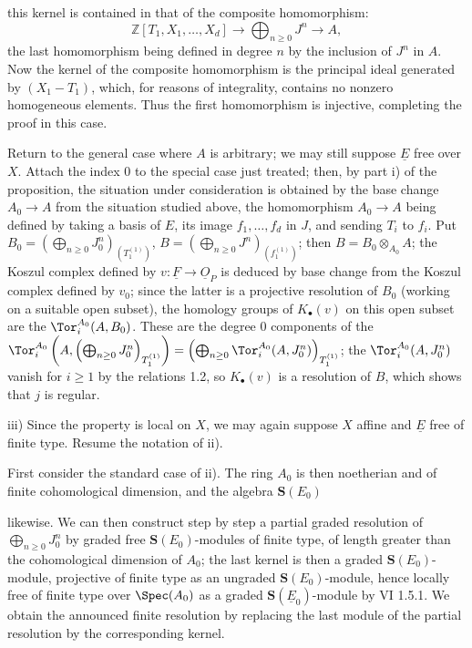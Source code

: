 %
this kernel is contained in that of the composite homomorphism:
\[
\mathbb Z[T_1,X_1,\ldots,X_d]\longrightarrow
\bigoplus_{n\ge0}J^n\longrightarrow A,
\]
the last homomorphism being defined in degree \(n\) by the inclusion of \(J^n\) in \(A\). Now the kernel of the composite homomorphism is the principal ideal generated by \((X_1-T_1)\), which, for reasons of integrality, contains no nonzero homogeneous elements. Thus the first homomorphism is injective, completing the proof in this case.

Return to the general case where \(A\) is arbitrary; we may still suppose \(\underline{E}\) free over \(X\). Attach the index \(0\) to the special case just treated; then, by part i) of the proposition, the situation under consideration is obtained by the base change \(A_0\to A\) from the situation studied above, the homomorphism \(A_0\to A\) being defined by taking a basis of \(E\), its image \(f_1,\ldots,f_d\) in \(J\), and sending \(T_i\) to \(f_i\). Put \(B_0=\left(\bigoplus_{n\ge0}J_0^n\right)_{(T_1^{(1)})}\), \(B=\left(\bigoplus_{n\ge0}J^n\right)_{(f_1^{(1)})}\); then \(B=B_0\otimes_{A_0}A\); the Koszul complex defined by \(v:\underline{F}\to\underline{O}_P\) is deduced by base change from the Koszul complex defined by \(v_0\); since the latter is a projective resolution of \(B_0\) (working on a suitable open subset), the homology groups of \(K_\bullet(v)\) on this open subset are the \(\Tor_i^{A_0}(A,B_0)\). These are the degree \(0\) components of the \(\Tor_i^{A_0}\left(A,\left(\bigoplus_{n\ge0}J_0^n\right)_{T_1^{(1)}}\right)=\left(\bigoplus_{n\ge0}\Tor_i^{A_0}(A,J_0^n)\right)_{T_1^{(1)}}\); the \(\Tor_i^{A_0}(A,J_0^n)\) vanish for \(i\ge1\) by the relations 1.2, so \(K_\bullet(v)\) is a resolution of \(B\), which shows that \(j\) is regular.

iii) Since the property is local on \(X\), we may again suppose \(X\) affine and \(\underline{E}\) free of finite type. Resume the notation of ii).

First consider the standard case of ii). The ring \(A_0\) is then noetherian and of finite cohomological dimension, and the algebra \(\mathbf{S}(E_0)\)

%
likewise. We can then construct step by step a partial graded resolution of \(\bigoplus_{n\ge0}J_0^n\) by graded free \(\mathbf{S}(E_0)\)-modules of finite type, of length greater than the cohomological dimension of \(A_0\); the last kernel is then a graded \(\mathbf{S}(E_0)\)-module, projective of finite type as an ungraded \(\mathbf{S}(E_0)\)-module, hence locally free of finite type over \(\Spec(A_0)\) as a graded \(\mathbf{S}(\underline{E}_0)\)-module by VI 1.5.1. We obtain the announced finite resolution by replacing the last module of the partial resolution by the corresponding kernel.

